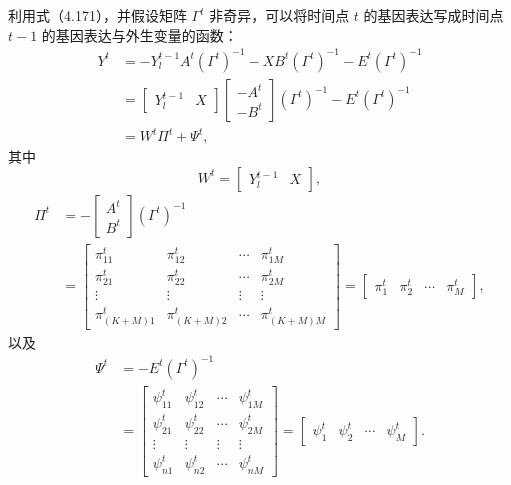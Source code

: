 利用式（4.171），并假设矩阵 $\Gamma^t$ 非奇异，可以将时间点 $t$ 的基因表达写成时间点 $t-1$ 的基因表达与外生变量的函数：
\begin{equation}
\begin{aligned}
Y^t&=-Y_l^{t-1}A^t(\Gamma^t)^{-1}
     -XB^t(\Gamma^t)^{-1}-E^t(\Gamma^t)^{-1}\\
 &=\begin{bmatrix}Y_l^{t-1}&X\end{bmatrix}
   \begin{bmatrix}-A^t\\-B^t\end{bmatrix}
   (\Gamma^t)^{-1}-E^t(\Gamma^t)^{-1}\\
 &=W^t\Pi^t+\Psi^t,
\end{aligned}\tag{4.194}
\end{equation}
其中
\begin{equation}
W^t=\begin{bmatrix}Y_l^{t-1}&X\end{bmatrix},\tag{4.195}
\end{equation}
\begin{equation}
\begin{aligned}
\Pi^t&=-\begin{bmatrix}A^t\\B^t\end{bmatrix}(\Gamma^t)^{-1}\\
 &=\begin{bmatrix}
\pi_{11}^t&\pi_{12}^t&\cdots&\pi_{1M}^t\\
\pi_{21}^t&\pi_{22}^t&\cdots&\pi_{2M}^t\\
\vdots&\vdots&\vdots&\vdots\\
\pi_{(K+M)1}^t&\pi_{(K+M)2}^t&\cdots&\pi_{(K+M)M}^t
\end{bmatrix}
=\begin{bmatrix}\pi_1^t&\pi_2^t&\cdots&\pi_M^t\end{bmatrix},
\end{aligned}\tag{4.196}
\end{equation}
以及
\begin{equation}
\begin{aligned}
\Psi^t&=-E^t(\Gamma^t)^{-1}\\
 &=\begin{bmatrix}
\psi_{11}^t&\psi_{12}^t&\cdots&\psi_{1M}^t\\
\psi_{21}^t&\psi_{22}^t&\cdots&\psi_{2M}^t\\
\vdots&\vdots&\vdots&\vdots\\
\psi_{n1}^t&\psi_{n2}^t&\cdots&\psi_{nM}^t
\end{bmatrix}
=\begin{bmatrix}\psi_1^t&\psi_2^t&\cdots&\psi_M^t\end{bmatrix}.
\end{aligned}\tag{4.197}
\end{equation}
